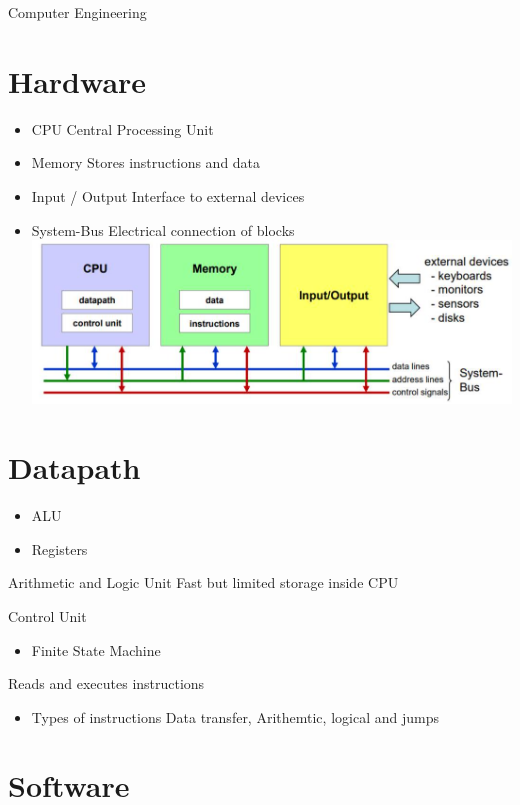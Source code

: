 \documentclass[10pt]{article}
\begin{document}
Computer Engineering

\section*{Hardware}
\begin{itemize}
  \item CPU Central Processing Unit
  \item Memory Stores instructions and data
  \item Input / Output Interface to external devices
  \item System-Bus Electrical connection of blocks\\
\includegraphics[max width=\textwidth, center]{2024_12_29_79e6b22f503fb7b4f718g-01(1)}
\end{itemize}

\section*{Datapath}
\begin{itemize}
  \item ALU
  \item Registers
\end{itemize}

Arithmetic and Logic Unit Fast but limited storage inside CPU

Control Unit

\begin{itemize}
  \item Finite State Machine
\end{itemize}

Reads and executes instructions

\begin{itemize}
  \item Types of instructions Data transfer, Arithemtic, logical and jumps
\end{itemize}

\section*{Software}
\end{document}

